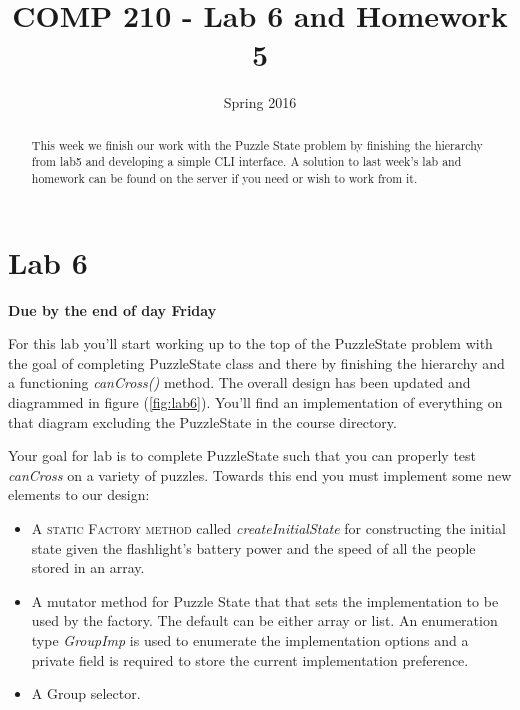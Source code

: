 \documentclass[nobib]{tufte-handout}
\title{COMP 210 - Lab 6 and Homework 5}
\date{Spring 2016}
\begin{document}
\maketitle

\begin{abstract}
This week we finish our work with the Puzzle State problem by finishing the hierarchy from lab5 and developing a simple CLI interface. A solution to last week's lab and homework can be found on the server if you need or wish to work from it.
\end{abstract}

\section{Lab 6}

\begin{center}
\textbf{Due by the end of day Friday}
\end{center}

For this lab you'll start working up to the top of the PuzzleState problem with the goal of completing PuzzleState class and there by finishing the hierarchy and a functioning \textit{canCross()} method.  The overall design has been updated and diagrammed in figure (\ref{fig:lab6}). You'll find an implementation of everything on that diagram excluding the PuzzleState in the course directory. 

Your goal for lab is to complete PuzzleState such that you can properly test \textit{canCross} on a variety of puzzles. Towards this end you must implement some new elements to our design:
\begin{itemize}
\item A \textsc{static Factory method} called \textit{createInitialState} for constructing the initial state given the flashlight's battery power and the speed of all the people stored in an array. 
\item A mutator method for Puzzle State that that sets the implementation to be used by the factory. The default can be either array or list. An enumeration type \textit{GroupImp} is used to enumerate the implementation options and a private field is required to store the current implementation preference. 
\item A Group selector. 
\end{itemize}
\end{document}

